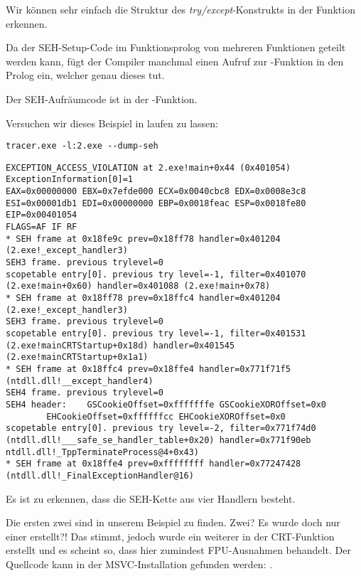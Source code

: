 Wir können sehr einfach die Struktur des \emph{try/except}-Konstrukts in der Funktion erkennen.

Da der SEH-Setup-Code im Funktionsprolog von mehreren Funktionen geteilt werden kann,
fügt der Compiler manchmal einen Aufruf zur -Funktion in den Prolog ein,
welcher genau dieses tut.

Der SEH-Aufräumcode ist in der -Funktion.

Versuchen wir dieses Beispiel in \tracer{} laufen zu lassen:

\begin{lstlisting}
tracer.exe -l:2.exe --dump-seh
\end{lstlisting}

\begin{lstlisting}[caption=tracer.exe output]
EXCEPTION_ACCESS_VIOLATION at 2.exe!main+0x44 (0x401054) ExceptionInformation[0]=1
EAX=0x00000000 EBX=0x7efde000 ECX=0x0040cbc8 EDX=0x0008e3c8
ESI=0x00001db1 EDI=0x00000000 EBP=0x0018feac ESP=0x0018fe80
EIP=0x00401054
FLAGS=AF IF RF
* SEH frame at 0x18fe9c prev=0x18ff78 handler=0x401204 (2.exe!_except_handler3)
SEH3 frame. previous trylevel=0
scopetable entry[0]. previous try level=-1, filter=0x401070 (2.exe!main+0x60) handler=0x401088 (2.exe!main+0x78)
* SEH frame at 0x18ff78 prev=0x18ffc4 handler=0x401204 (2.exe!_except_handler3)
SEH3 frame. previous trylevel=0
scopetable entry[0]. previous try level=-1, filter=0x401531 (2.exe!mainCRTStartup+0x18d) handler=0x401545 (2.exe!mainCRTStartup+0x1a1)
* SEH frame at 0x18ffc4 prev=0x18ffe4 handler=0x771f71f5 (ntdll.dll!__except_handler4)
SEH4 frame. previous trylevel=0
SEH4 header:	GSCookieOffset=0xfffffffe GSCookieXOROffset=0x0
		EHCookieOffset=0xffffffcc EHCookieXOROffset=0x0
scopetable entry[0]. previous try level=-2, filter=0x771f74d0 (ntdll.dll!___safe_se_handler_table+0x20) handler=0x771f90eb ntdll.dll!_TppTerminateProcess@4+0x43)
* SEH frame at 0x18ffe4 prev=0xffffffff handler=0x77247428 (ntdll.dll!_FinalExceptionHandler@16)
\end{lstlisting}

Es ist zu erkennen, dass die SEH-Kette aus vier Handlern besteht.

Die ersten zwei sind in unserem Beispiel zu finden. Zwei?
Es wurde doch nur einer erstellt?!
Das stimmt, jedoch wurde ein weiterer in der \ac{CRT}-Funktion 
erstellt und es scheint so, dass hier zumindest \ac{FPU}-Ausnahmen behandelt.
Der Quellcode kann in der MSVC-Installation gefunden werden: .


